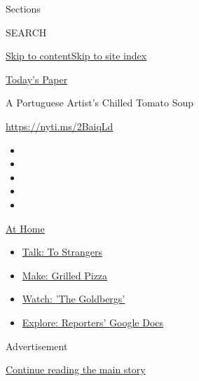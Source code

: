Sections

SEARCH

\protect\hyperlink{site-content}{Skip to
content}\protect\hyperlink{site-index}{Skip to site index}

\href{https://myaccount.nytimes3xbfgragh.onion/auth/login?response_type=cookie\&client_id=vi}{}

\href{https://www.nytimes3xbfgragh.onion/section/todayspaper}{Today's
Paper}

A Portuguese Artist's Chilled Tomato Soup

\url{https://nyti.ms/2BaiqLd}

\begin{itemize}
\item
\item
\item
\item
\item
\end{itemize}

\href{https://www.nytimes3xbfgragh.onion/spotlight/at-home?action=click\&pgtype=Article\&state=default\&region=TOP_BANNER\&context=at_home_menu}{At
Home}

\begin{itemize}
\tightlist
\item
  \href{https://www.nytimes3xbfgragh.onion/2020/08/03/well/family/the-benefits-of-talking-to-strangers.html?action=click\&pgtype=Article\&state=default\&region=TOP_BANNER\&context=at_home_menu}{Talk:
  To Strangers}
\item
  \href{https://www.nytimes3xbfgragh.onion/2020/08/01/at-home/coronavirus-make-pizza-on-a-grill.html?action=click\&pgtype=Article\&state=default\&region=TOP_BANNER\&context=at_home_menu}{Make:
  Grilled Pizza}
\item
  \href{https://www.nytimes3xbfgragh.onion/2020/07/31/arts/television/goldbergs-abc-stream.html?action=click\&pgtype=Article\&state=default\&region=TOP_BANNER\&context=at_home_menu}{Watch:
  'The Goldbergs'}
\item
  \href{https://www.nytimes3xbfgragh.onion/interactive/2020/at-home/even-more-reporters-editors-diaries-lists-recommendations.html?action=click\&pgtype=Article\&state=default\&region=TOP_BANNER\&context=at_home_menu}{Explore:
  Reporters' Google Docs}
\end{itemize}

Advertisement

\protect\hyperlink{after-top}{Continue reading the main story}

